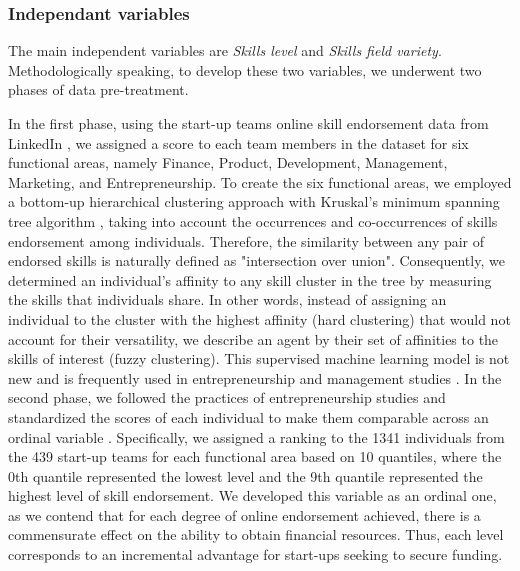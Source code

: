 \documentclass[12pt]{article}
\begin{document}
\subsubsection{Independant variables}

The main independent variables are \textit{Skills level} and \textit{Skills field variety}. Methodologically speaking, to develop these two variables, we underwent two phases of data pre-treatment.

In the first phase, using the start-up teams online skill endorsement data from LinkedIn \citep{rapanta2017linkedin}, we assigned a score to each team members in the dataset for six functional areas, namely Finance, Product, Development, Management, Marketing, and Entrepreneurship. To create the six functional areas, we employed a bottom-up hierarchical clustering approach with Kruskal's minimum spanning tree algorithm \citep{kruskal1956shortest}, taking into account the occurrences and co-occurrences of skills endorsement among individuals. Therefore, the similarity between any pair of endorsed skills is naturally defined as "intersection over union". Consequently, we determined an individual's affinity to any skill cluster in the tree by measuring the skills that individuals share. In other words, instead of assigning an individual to the cluster with the highest affinity (hard clustering) that would not account for their versatility, we describe an agent by their set of affinities to the skills of interest (fuzzy clustering). This supervised machine learning model is not new and is frequently used in entrepreneurship and management studies \citep{kaushal2021artificial}. In the second phase, we followed the practices of entrepreneurship studies and standardized the scores of each individual to make them comparable across an ordinal variable \citep{harrison2007s}. Specifically, we assigned a ranking to the 1341 individuals from the 439 start-up teams for each functional area based on 10 quantiles, where the 0th quantile represented the lowest level and the 9th quantile represented the highest level of skill endorsement. We developed this variable as an ordinal one, as we contend that for each degree of online endorsement achieved, there is a commensurate effect on the ability to obtain financial resources. Thus, each level corresponds to an incremental advantage for start-ups seeking to secure funding.
\end{document}
